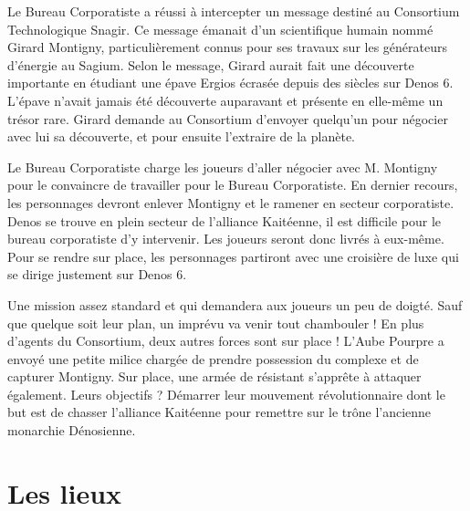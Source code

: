 \begin{multicols}{2}

Le Bureau Corporatiste a réussi à intercepter un message destiné au Consortium Technologique Snagir. Ce message émanait d'un scientifique humain nommé Girard Montigny, particulièrement connus pour ses travaux sur les générateurs d'énergie au Sagium. Selon le message, Girard aurait fait une découverte importante en étudiant une épave Ergios écrasée depuis des siècles sur Denos 6. L'épave n'avait jamais été découverte auparavant et présente en elle-même un trésor rare. Girard demande au Consortium d'envoyer quelqu'un pour négocier avec lui sa découverte, et pour ensuite l'extraire de la planète.

Le Bureau Corporatiste charge les joueurs d'aller négocier avec M. Montigny pour le convaincre de travailler pour le Bureau Corporatiste. En dernier recours, les personnages devront enlever Montigny et le ramener en secteur corporatiste. Denos se trouve en plein secteur de l'alliance Kaitéenne, il est difficile pour le bureau corporatiste d'y intervenir. Les joueurs seront donc livrés à eux-même. Pour se rendre sur place, les personnages partiront avec une croisière de luxe qui se dirige justement sur Denos 6.

Une mission assez standard et qui demandera aux joueurs un peu de doigté. Sauf que quelque soit leur plan, un imprévu va venir tout chambouler ! En plus d'agents du Consortium, deux autres forces sont sur place ! L'Aube Pourpre a envoyé une petite milice chargée de prendre possession du complexe et de capturer Montigny. Sur place, une armée de résistant s'apprête à attaquer également. Leurs objectifs ? Démarrer leur mouvement révolutionnaire dont le but est de chasser l'alliance Kaitéenne pour remettre sur le trône l'ancienne monarchie Dénosienne.

\end{multicols}

\chapter{Les lieux}

